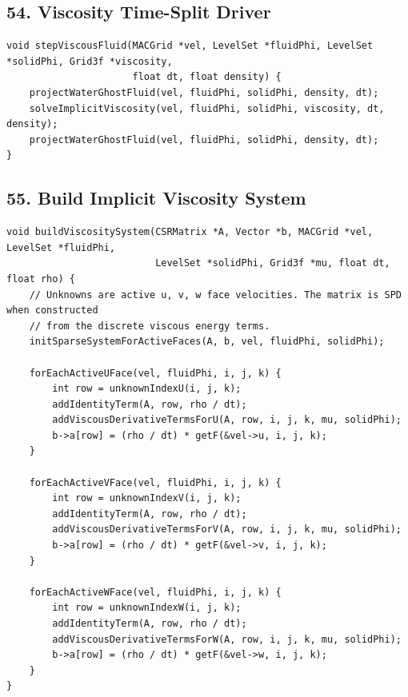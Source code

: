 \documentclass[10pt,letterpaper]{article}
\begin{document}
\subsection*{54. Viscosity Time-Split Driver}

\begin{verbatim}
void stepViscousFluid(MACGrid *vel, LevelSet *fluidPhi, LevelSet *solidPhi, Grid3f *viscosity,
                      float dt, float density) {
    projectWaterGhostFluid(vel, fluidPhi, solidPhi, density, dt);
    solveImplicitViscosity(vel, fluidPhi, solidPhi, viscosity, dt, density);
    projectWaterGhostFluid(vel, fluidPhi, solidPhi, density, dt);
}
\end{verbatim}

\subsection*{55. Build Implicit Viscosity System}

\begin{verbatim}
void buildViscositySystem(CSRMatrix *A, Vector *b, MACGrid *vel, LevelSet *fluidPhi,
                          LevelSet *solidPhi, Grid3f *mu, float dt, float rho) {
    // Unknowns are active u, v, w face velocities. The matrix is SPD when constructed
    // from the discrete viscous energy terms.
    initSparseSystemForActiveFaces(A, b, vel, fluidPhi, solidPhi);

    forEachActiveUFace(vel, fluidPhi, i, j, k) {
        int row = unknownIndexU(i, j, k);
        addIdentityTerm(A, row, rho / dt);
        addViscousDerivativeTermsForU(A, row, i, j, k, mu, solidPhi);
        b->a[row] = (rho / dt) * getF(&vel->u, i, j, k);
    }

    forEachActiveVFace(vel, fluidPhi, i, j, k) {
        int row = unknownIndexV(i, j, k);
        addIdentityTerm(A, row, rho / dt);
        addViscousDerivativeTermsForV(A, row, i, j, k, mu, solidPhi);
        b->a[row] = (rho / dt) * getF(&vel->v, i, j, k);
    }

    forEachActiveWFace(vel, fluidPhi, i, j, k) {
        int row = unknownIndexW(i, j, k);
        addIdentityTerm(A, row, rho / dt);
        addViscousDerivativeTermsForW(A, row, i, j, k, mu, solidPhi);
        b->a[row] = (rho / dt) * getF(&vel->w, i, j, k);
    }
}
\end{verbatim}
\end{document}

